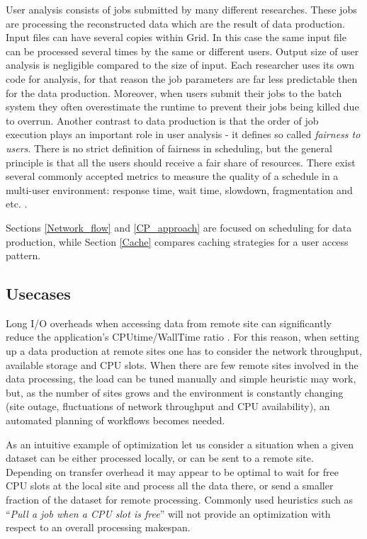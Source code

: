 \documentclass[english]{ddny}
\begin{document}
User analysis consists of jobs submitted by many different researches. These jobs are processing the reconstructed data which are the result of data production. Input files can have several copies within Grid. In this case the same input file can be processed several times by the same or different users. Output size of user analysis is negligible compared to the size of input. Each researcher uses its own code for analysis, for that reason the job parameters are far less predictable then for the data production. Moreover, when users submit their jobs to the batch system they often overestimate the runtime  to prevent their jobs being killed due to overrun.  Another contrast to data production is that the order of job execution plays an important role in user analysis - it defines so called \textit{fairness to users}. There is no strict definition of fairness in scheduling, but the general principle is that all the users should receive a fair share of resources. There exist several commonly accepted metrics to measure the quality of a schedule in a multi-user environment: response time, wait time, slowdown, fragmentation and etc. \cite{Rudova_Tabu_search}. 

Sections \ref{Network_flow} and \ref{CP_approach} are focused on scheduling for data production, while Section \ref{Cache} compares caching strategies for a user access pattern. 

\subsection{Usecases}
Long I/O overheads when accessing data from remote site can significantly reduce the application's CPUtime/WallTime ratio \cite{HorkyACAT,Betev}. For this reason, when setting up a data production at remote sites one has to consider the network throughput, available storage and CPU slots. When there are few remote sites involved in the data processing, the load can be tuned manually and simple heuristic may work, but, as the number of sites grows and the environment is constantly changing (site outage, fluctuations of network throughput and CPU availability), an automated planning of workflows becomes needed. 

As an intuitive example of optimization let us consider a situation when a given dataset can be either processed locally, or can be sent to a remote site. Depending on transfer overhead it may appear to be optimal to wait for free CPU slots at the local site and process all the data there, or send a smaller fraction of the dataset for remote processing. Commonly used heuristics such as ``\textit{Pull a job when a CPU slot is free}'' will not provide an optimization with respect to an overall processing makespan.  
\end{document}
